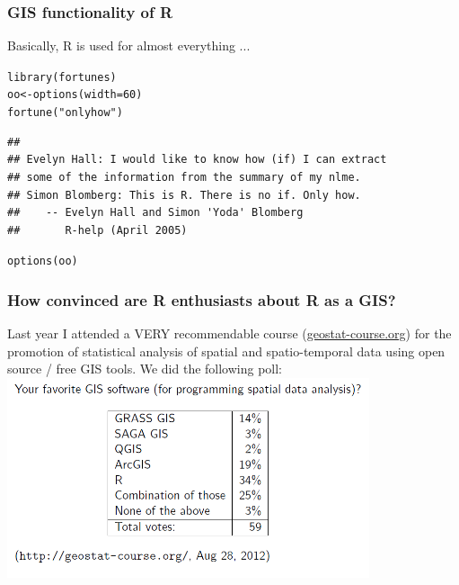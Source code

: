 \documentclass[xcolor=table, xcolor=dvipsnames]{beamer}\usepackage[]{graphicx}\usepackage[]{color}
\makeatletter
\newcommand{\hlnum}[1]{\textcolor[rgb]{0,0,0}{#1}}
\newcommand{\hlstr}[1]{\textcolor[rgb]{0.545,0.137,0.137}{#1}}
\newcommand{\hlstd}[1]{\textcolor[rgb]{0,0,0}{#1}}
\newcommand{\hlkwb}[1]{\textcolor[rgb]{0,0,0}{#1}}
\newcommand{\hlkwc}[1]{\textcolor[rgb]{1,0,1}{#1}}
\newcommand{\hlkwd}[1]{\textcolor[rgb]{0,0,1}{#1}}
\newenvironment{kframe}{%
 \def\at@end@of@kframe{}%
 \ifinner\ifhmode%
  \def\at@end@of@kframe{\end{minipage}}%
  \begin{minipage}{\columnwidth}%
 \fi\fi%
 \def\FrameCommand##1{\hskip\@totalleftmargin \hskip-\fboxsep
 \colorbox{shadecolor}{##1}\hskip-\fboxsep
     \hskip-\linewidth \hskip-\@totalleftmargin \hskip\columnwidth}%
 \MakeFramed {\advance\hsize-\width
   \@totalleftmargin\z@ \linewidth\hsize
   \@setminipage}}%
 {\par\unskip\endMakeFramed%
 \at@end@of@kframe}
\newenvironment{knitrout}{}{} %
\makeatother
\begin{document}
\begin{frame}[fragile]\frametitle{GIS functionality of R}
Basically, R is used for almost everything ...
\begin{knitrout}
\color{fgcolor}\begin{kframe}
\begin{alltt}
\hlkwd{library}\hlstd{(fortunes)}
\hlstd{oo} \hlkwb{<-} \hlkwd{options}\hlstd{(}\hlkwc{width}\hlstd{=}\hlnum{60}\hlstd{)}
\hlkwd{fortune}\hlstd{(}\hlstr{"only how"}\hlstd{)}
\end{alltt}
\begin{verbatim}
## 
## Evelyn Hall: I would like to know how (if) I can extract
## some of the information from the summary of my nlme.
## Simon Blomberg: This is R. There is no if. Only how.
##    -- Evelyn Hall and Simon 'Yoda' Blomberg
##       R-help (April 2005)
\end{verbatim}
\begin{alltt}
\hlkwd{options}\hlstd{(oo)}
\end{alltt}
\end{kframe}
\end{knitrout}
\end{frame}


\begin{frame}[fragile]\frametitle{How convinced are R enthusiasts about R as a GIS?}
  Last year I attended a VERY recommendable course (\href{http://geostat-course.org/}{geostat-course.org}) for the promotion of statistical analysis of spatial and spatio-temporal data using open source / free GIS tools. We did the following poll:
  \includegraphics[width=0.8\textwidth]{./externalfig/GEOSTAT_poll.png}
\end{frame}

\end{document}
